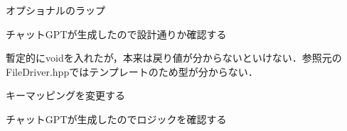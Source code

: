 
\begin{DoxyRefList}
\item[Member \mbox{\hyperlink{classcommand_1_1CommandBuilder_af4caf13430843894f03aefdb62d89f08}{command\+::Command\+Builder\+::build}} () -\/$>$ Context\+Ptr$<$ Command $>$]\label{todo__todo000002}%
%
オプショナルのラップ  
\item[Member \mbox{\hyperlink{classcommand_1_1CommandManager_a909a5e9ad9e7c1b05e14b04027352616}{command\+::Command\+Manager\+::Undo}} () -\/$>$ void]\label{todo__todo000001}%
%
チャット\+GPTが生成したので設計通りか確認する  
\item[Class \mbox{\hyperlink{classfileIO_1_1FileIO}{file\+IO\+::File\+IO}} ]\label{todo__todo000003}%
%
暫定的にvoidを入れたが，本来は戻り値が分からないといけない．参照元の\+File\+Driver.\+hppではテンプレートのため型が分からない．  
\item[Member \mbox{\hyperlink{classUI_1_1NcursesUI_a747800e9d9fc788a5c879a410a0d6f03}{UI\+::Ncurses\+UI\+::Get\+Input}} () -\/$>$ \mbox{\hyperlink{namespacetextEditor_ade3de5dab8e0c8cbcfb9bf305a51af4e}{text\+Editor\+::\+Key}} override]\label{todo__todo000005}%
%
キーマッピングを変更する  
\item[Member \mbox{\hyperlink{classutil_1_1Stack_a759a326bd3d83705be9bc0eb78e367c0}{util\+::Stack$<$ T $>$\+::Top}} () const]\label{todo__todo000004}%
%
チャット\+GPTが生成したのでロジックを確認する 
\end{DoxyRefList}